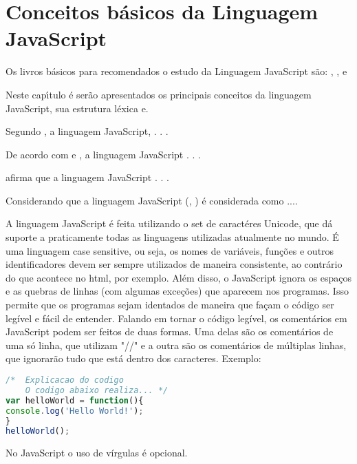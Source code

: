 

\chapter{ Conceitos b\'{a}sicos da Linguagem JavaScript}

Os livros b\'{a}sicos para recomendados o estudo da Linguagem JavaScript s\~{a}o: \cite{Scott2021}, \cite{Flanagan2020}, \cite{Scott2020} e \cite{Morgan2018}

Neste cap\'{\i}tulo \'{e} serão apresentados os principais conceitos da linguagem JavaScript, sua estrutura léxica e.

Segundo \cite{seb11}, a linguagem JavaScript,  . . .

De acordo com \cite{seb11} e \cite{roy04}, a linguagem JavaScript . . .

\cite{seb11} afirma que a linguagem JavaScript . . .

Considerando que a linguagem JavaScript (\cite{seb11}, \cite{wat90}) \'{e} considerada como ....

A linguagem JavaScript é feita utilizando o set de caractéres Unicode, que dá suporte a praticamente todas as linguagens utilizadas
atualmente no mundo. É uma linguagem case sensitive, ou seja, os nomes de variáveis, funções e outros identificadores devem ser sempre utilizados de maneira consistente, ao contrário do que acontece no html, por exemplo. %
Além disso, o JavaScript ignora os espaços e as quebras de linhas (com algumas exceções) que aparecem nos programas. Isso permite que os programas sejam identados de maneira que façam o código ser legível e fácil de entender.
Falando em tornar o código legível, os comentários em JavaScript podem ser feitos de duas formas. Uma delas são os comentários de uma só linha, que utilizam "//" e a outra são os comentários de múltiplas linhas, que ignorarão tudo que está dentro dos caracteres.
Exemplo:
\newline
\begin{lstlisting}[language=JavaScript]
/*  Explicacao do codigo
	O codigo abaixo realiza... */
var helloWorld = function(){
console.log('Hello World!');
}
helloWorld();
\end{lstlisting}
No JavaScript o uso de vírgulas é opcional.
 



